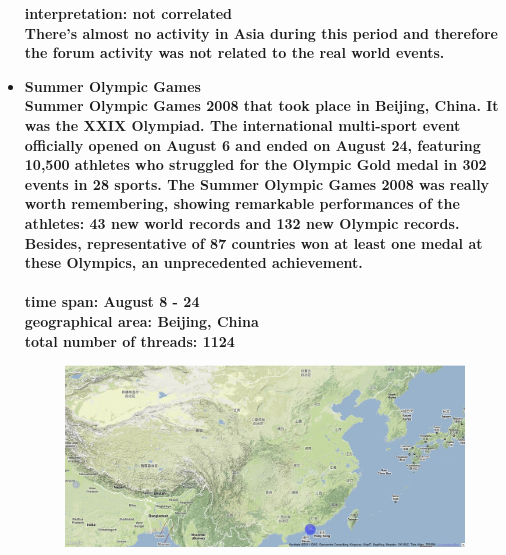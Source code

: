 \documentclass[11pt,a4paper,english]{article}
\begin{document}
\begin{itemize}
\begin{figure}[H]
\begin{center}
							\end{center}
							\vspace{-13pt}
						\end{figure}						
						\bf interpretation: \rm not correlated
						\\ There's almost no activity in Asia during this period and therefore the forum activity was not related to the real world events.
						
						

					\item \bf Summer Olympic Games \rm
						\\ Summer Olympic Games 2008 that took place in Beijing, China. It was the XXIX Olympiad. The international multi-sport event officially opened on August 6 and ended on August 24, featuring 10,500 athletes who struggled for the Olympic Gold medal in 302 events in 28 sports. The Summer Olympic Games 2008 was really worth remembering, showing remarkable performances of the athletes: 43 new world records and 132 new Olympic records. Besides, representative of 87 countries won at least one medal at these Olympics, an unprecedented achievement.
						\\\\ \bf time span: \rm August 8 - 24
						\\ \bf geographical area: \rm Beijing, China
						\\ \bf total number of threads: \rm 1124
						\begin{figure}[H]
							\vspace{-13pt}
  							\begin{center}
								\includegraphics[width=130mm]{img/pre-olympic}
							\end{center}
							\vspace{-13pt}
						\end{figure}
						\begin{figure}[H]
							\vspace{-13pt}

\end{figure}
\end{itemize}
\end{document}
